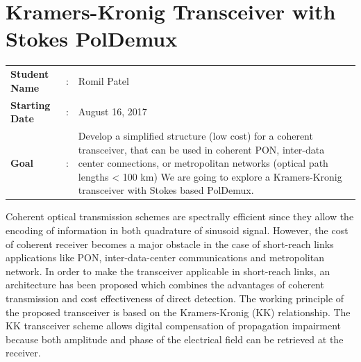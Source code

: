 \clearpage
\section{Kramers-Kronig Transceiver  with Stokes PolDemux}

\begin{tcolorbox}	
\begin{tabular}{p{2.75cm} p{0.2cm} p{10.5cm}} 	
\textbf{Student Name}  &:& Romil Patel\\
\textbf{Starting Date} &:& August 16, 2017\\
\textbf{Goal}          &:& Develop a simplified structure (low cost) for a coherent transceiver, that can be used in coherent PON, inter-data center connections, or metropolitan networks (optical path lengths < 100 km) We are going to explore a Kramers-Kronig transceiver with Stokes based PolDemux.
\end{tabular}
\end{tcolorbox}

Coherent optical transmission schemes are spectrally efficient since they allow the encoding of information in both quadrature of sinusoid signal. However, the cost of coherent receiver becomes a major obstacle in the case of short-reach links applications like PON, inter-data-center communications and metropolitan network. In order to make the transceiver applicable in short-reach links, an architecture has been proposed which combines the advantages of coherent transmission and cost effectiveness of direct detection. The working principle of the proposed transceiver is based on the Kramers-Kronig (KK) relationship. The KK transceiver scheme allows digital compensation of propagation impairment because both amplitude and phase of the electrical field can be retrieved at the receiver. 
